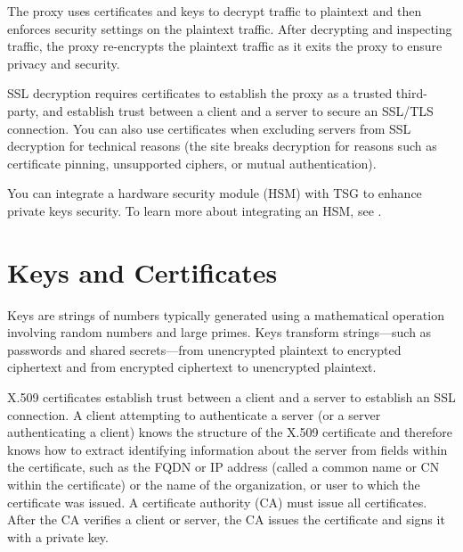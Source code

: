 The proxy uses certificates and keys to decrypt traffic to plaintext and then enforces security settings on the plaintext traffic. 
After decrypting and inspecting traffic, the proxy re-encrypts the plaintext traffic as it exits the proxy to ensure privacy and security.


SSL decryption requires certificates to establish the proxy as a trusted third-party, and establish trust between a client and a server to secure an SSL/TLS connection. 
You can also use certificates when excluding servers from SSL decryption for technical reasons 
(the site breaks decryption for reasons such as certificate pinning, unsupported ciphers, or mutual authentication).


You can integrate a hardware security module (HSM) with TSG to enhance private keys security. 
To learn more about integrating an HSM, see \hyperlink{link:Manage Keys with a Hardware Security Module}{\color{linkblue}{Manage Keys with a Hardware Security Module}}.

\section*{\hypertarget{link:Keys and Certificates}{Keys and Certificates}}
\label{sec:decrypt:keys}

Keys are strings of numbers typically generated using a mathematical operation involving random numbers and large primes. 
Keys transform strings—such as passwords and shared secrets—from unencrypted plaintext to encrypted ciphertext and from encrypted ciphertext to unencrypted plaintext. 


X.509 certificates establish trust between a client and a server to establish an SSL connection. A client attempting to authenticate a server (or a server authenticating a client) knows the structure of the X.509 certificate and therefore knows how to extract identifying information about the server from fields within the certificate, such as the FQDN or IP address (called a common name or CN within the certificate) or the name of the organization, or user to which the certificate was issued. A certificate authority (CA) must issue all certificates. After the CA verifies a client or server, the CA issues the certificate and signs it with a private key.


